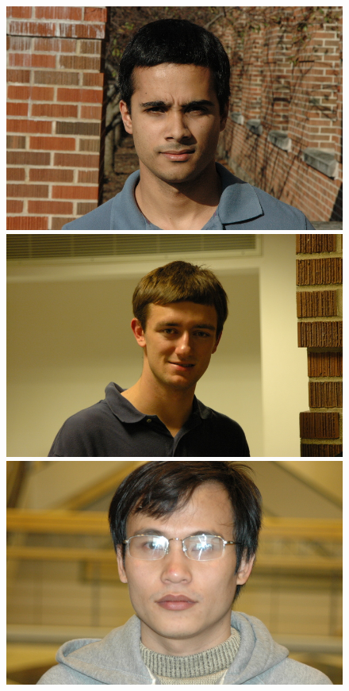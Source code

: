 \begin{figure}
\includegraphics[scale=0.35,clip=true]{figures_cvpr/examples/1/DSC_1622.JPG} 
\includegraphics[scale=0.35,clip=true]{figures_cvpr/examples/1/DSC_1786.JPG} \\
\includegraphics[scale=0.35,clip=true]{figures_cvpr/examples/2/DSC_1448.JPG} 

\end{figure}
